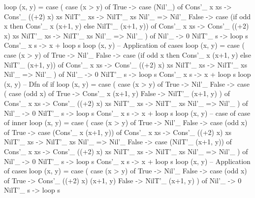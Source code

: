 \begin{spec}
loop (x, y) = case (
                case (x > y) of
                  True -> case (Nil'_) of
                    Cons'_ x xs -> Cons'_ ((+2) x) xs
                    NilT'_ xs -> NilT'_ xs
                    Nil'_ => Nil'_
                  False -> case (if odd x then Cons'_ x (x+1, y) else NilT'_ (x+1, y)) of
                    Cons'_ x xs -> Cons'_ ((+2) x) xs
                    NilT'_ xs -> NilT'_ xs
                    Nil'_ => Nil'_
              ) of
                Nil'_ -> 0
                NilT'_ s -> loop s
                Cons'_ x s -> x + loop s
loop (x, y)
-- Application of cases
loop (x, y) = case (
                case (x > y) of
                  True -> Nil'_
                  False -> case (if odd x then Cons'_ x (x+1, y) else NilT'_ (x+1, y)) of
                    Cons'_ x xs -> Cons'_ ((+2) x) xs
                    NilT'_ xs -> NilT'_ xs
                    Nil'_ => Nil'_
              ) of
                Nil'_ -> 0
                NilT'_ s -> loop s
                Cons'_ x s -> x + loop s
loop (x, y)
-- Dfn of if
loop (x, y) = case (
                case (x > y) of
                  True -> Nil'_
                  False -> case (
                    case (odd x) of
                      True -> Cons'_ x (x+1, y) 
                      False -> NilT'_ (x+1, y)
                  ) of
                    Cons'_ x xs -> Cons'_ ((+2) x) xs
                    NilT'_ xs -> NilT'_ xs
                    Nil'_ => Nil'_
              ) of
                Nil'_ -> 0
                NilT'_ s -> loop s
                Cons'_ x s -> x + loop s
loop (x, y)
-- case of case of inner
loop (x, y) = case (
                case (x > y) of
                  True -> Nil'_
                  False ->  case (odd x) of
                    True -> case (Cons'_ x (x+1, y)) of
                      Cons'_ x xs -> Cons'_ ((+2) x) xs
                      NilT'_ xs -> NilT'_ xs
                      Nil'_ => Nil'_
                    False -> case (NilT'_ (x+1, y)) of
                      Cons'_ x xs -> Cons'_ ((+2) x) xs
                      NilT'_ xs -> NilT'_ xs
                      Nil'_ => Nil'_
              ) of
                Nil'_ -> 0
                NilT'_ s -> loop s
                Cons'_ x s -> x + loop s
loop (x, y)
-- Application of cases
loop (x, y) = case (
                case (x > y) of
                  True -> Nil'_
                  False ->  case (odd x) of
                    True -> Cons'_ ((+2) x) (x+1, y)
                    False -> NilT'_ (x+1, y)
              ) of
                Nil'_ -> 0
                NilT'_ s -> loop s

\end{spec}

